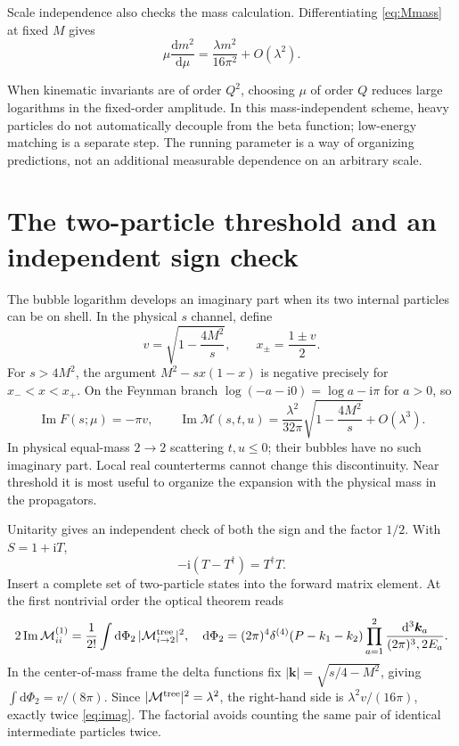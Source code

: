 \documentclass[11pt]{article}
\newcommand{\dd}{\mathrm d}
\newcommand{\ii}{\mathrm i}
\newcommand{\module}[1]{\clearpage\section{#1}}
\begin{document}
Scale independence also checks the mass calculation. Differentiating
\eqref{eq:Mmass} at fixed \(M\) gives
\begin{equation}
 \mu\frac{\dd m^2}{\dd\mu}=\frac{\lambda m^2}{16\pi^2}+O(\lambda^2).
\end{equation}
\begin{remarkbox}
When kinematic invariants are of order \(Q^2\), choosing \(\mu\) of
order \(Q\) reduces large logarithms in the fixed-order amplitude.
In this mass-independent scheme, heavy particles do not automatically
decouple from the beta function; low-energy matching is a separate
step. The running parameter is a way of organizing predictions,
not an additional measurable dependence on an arbitrary scale.
\end{remarkbox}

\module{The two-particle threshold and an independent sign check}
The bubble logarithm develops an imaginary part when its two internal
particles can be on shell. In the physical \(s\) channel, define
\begin{equation}
 v=\sqrt{1-\frac{4M^2}{s}},\qquad x_\pm=\frac{1\pm v}{2}.
\end{equation}
For \(s>4M^2\), the argument \(M^2-sx(1-x)\) is negative precisely
for \(x_-<x<x_+\). On the Feynman branch
\(\log(-a-\ii0)=\log a-\ii\pi\) for \(a>0\), so
\begin{equation}
 \operatorname{Im}F(s;\mu)=-\pi v,\qquad
 \operatorname{Im}\mathcal M(s,t,u)
 =\frac{\lambda^2}{32\pi}\sqrt{1-\frac{4M^2}{s}}+O(\lambda^3).
 \label{eq:imag}
\end{equation}
In physical equal-mass \(2\to2\) scattering \(t,u\leq0\); their bubbles
have no such imaginary part. Local real counterterms cannot change
this discontinuity. Near threshold it is most useful to organize the
expansion with the physical mass in the propagators.

Unitarity gives an independent check of both the sign and the factor
\(1/2\). With \(S=1+\ii T\),
\begin{equation}
 -\ii(T-T^\dagger)=T^\dagger T.
\end{equation}
Insert a complete set of two-particle states into the forward matrix
element. At the first nontrivial order the optical theorem reads
\begin{equation}
 2\operatorname{Im}\mathcal M_{ii}^{(1)}
 =\frac1{2!}\int\dd\Phi_2\,
 |\mathcal M_{i\to2}^{\rm tree}|^2,
 \quad
 \dd\Phi_2=(2\pi)^4\delta^{(4)}(P-k_1-k_2)
 \prod_{a=1}^2\frac{\dd^3\bm k_a}{(2\pi)^3,2E_a}.
\end{equation}
In the center-of-mass frame the delta functions fix
\(|\bm k|=\sqrt{s/4-M^2}\), giving
\(\int\dd\Phi_2=v/(8\pi)\). Since
\(|\mathcal M^{\rm tree}|^2=\lambda^2\), the right-hand side is
\(\lambda^2v/(16\pi)\), exactly twice \eqref{eq:imag}.
The factorial avoids counting the same pair of identical intermediate
particles twice.
\end{document}
